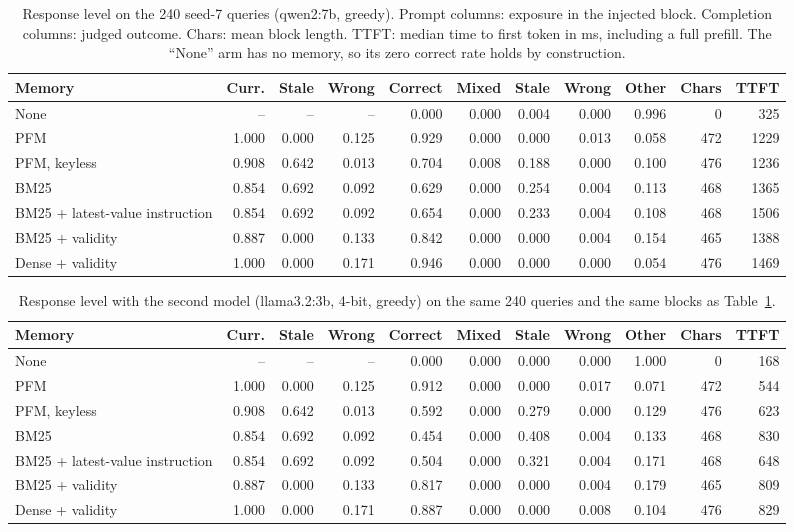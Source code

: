 \documentclass{article} %
\begin{document}
\begin{table}[h]
\centering
\footnotesize
\setlength{\tabcolsep}{3.5pt}
\begin{tabular}{@{}lrrrrrrrrrr@{}}
\toprule
Memory & Curr. & Stale & Wrong & Correct & Mixed & Stale & Wrong & Other & Chars & TTFT \\
\midrule
None & -- & -- & -- & 0.000 & 0.000 & 0.004 & 0.000 & 0.996 & 0 & 325 \\
PFM & 1.000 & 0.000 & 0.125 & 0.929 & 0.000 & 0.000 & 0.013 & 0.058 & 472 & 1229 \\
PFM, keyless & 0.908 & 0.642 & 0.013 & 0.704 & 0.008 & 0.188 & 0.000 & 0.100 & 476 & 1236 \\
BM25 & 0.854 & 0.692 & 0.092 & 0.629 & 0.000 & 0.254 & 0.004 & 0.113 & 468 & 1365 \\
BM25 + latest-value instruction & 0.854 & 0.692 & 0.092 & 0.654 & 0.000 & 0.233 & 0.004 & 0.108 & 468 & 1506 \\
BM25 + validity & 0.887 & 0.000 & 0.133 & 0.842 & 0.000 & 0.000 & 0.004 & 0.154 & 465 & 1388 \\
Dense + validity & 1.000 & 0.000 & 0.171 & 0.946 & 0.000 & 0.000 & 0.000 & 0.054 & 476 & 1469 \\
\bottomrule
\end{tabular}
\caption{Response level on the 240 seed-7 queries (qwen2:7b, greedy). Prompt columns: exposure in the injected block. Completion columns: judged outcome. Chars: mean block length. TTFT: median time to first token in ms, including a full prefill. The ``None'' arm has no memory, so its zero correct rate holds by construction.}
\label{tab:llm}
\end{table}
\begin{table}[h]
\centering
\footnotesize
\setlength{\tabcolsep}{3.5pt}
\begin{tabular}{@{}lrrrrrrrrrr@{}}
\toprule
Memory & Curr. & Stale & Wrong & Correct & Mixed & Stale & Wrong & Other & Chars & TTFT \\
\midrule
None & -- & -- & -- & 0.000 & 0.000 & 0.000 & 0.000 & 1.000 & 0 & 168 \\
PFM & 1.000 & 0.000 & 0.125 & 0.912 & 0.000 & 0.000 & 0.017 & 0.071 & 472 & 544 \\
PFM, keyless & 0.908 & 0.642 & 0.013 & 0.592 & 0.000 & 0.279 & 0.000 & 0.129 & 476 & 623 \\
BM25 & 0.854 & 0.692 & 0.092 & 0.454 & 0.000 & 0.408 & 0.004 & 0.133 & 468 & 830 \\
BM25 + latest-value instruction & 0.854 & 0.692 & 0.092 & 0.504 & 0.000 & 0.321 & 0.004 & 0.171 & 468 & 648 \\
BM25 + validity & 0.887 & 0.000 & 0.133 & 0.817 & 0.000 & 0.000 & 0.004 & 0.179 & 465 & 809 \\
Dense + validity & 1.000 & 0.000 & 0.171 & 0.887 & 0.000 & 0.000 & 0.008 & 0.104 & 476 & 829 \\
\bottomrule
\end{tabular}
\caption{Response level with the second model (llama3.2:3b, 4-bit, greedy) on the same 240 queries and the same blocks as Table~\ref{tab:llm}.}
\label{tab:llm_llama}
\end{table}
\end{document}
